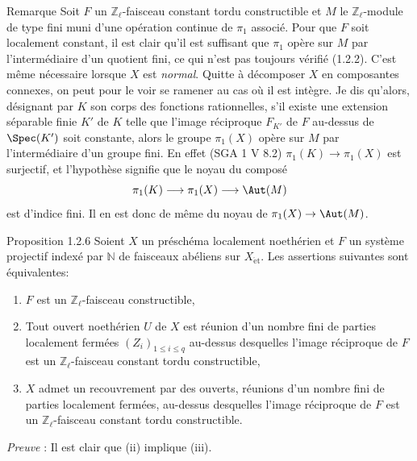 \begin{statement}{Remarque}
Soit \(F\) un \(\mathbb{Z}_\ell\)-faisceau constant tordu constructible et \(M\) le \(\mathbb{Z}_\ell\)-module de type fini muni d'une opération continue de \(\pi_1\) associé. Pour que \(F\) soit localement constant, il est clair qu'il est suffisant que \(\pi_1\) opère sur \(M\) par l'intermédiaire d'un quotient fini, ce qui n'est pas toujours vérifié (1.2.2). C'est même nécessaire lorsque \(X\) est \emph{normal}. Quitte à décomposer \(X\) en composantes connexes, on peut pour le voir se ramener au cas où il est intègre. Je dis qu'alors, désignant par \(K\) son corps des fonctions rationnelles, s'il existe une extension séparable finie \(K'\) de \(K\) telle que l'image réciproque \(F_{K'}\) de \(F\) au-dessus de \(\Spec(K')\) soit constante, alors le groupe \(\pi_1(X)\) opère sur \(M\) par l'intermédiaire d'un groupe fini. En effet (SGA 1 V 8.2) \(\pi_1(K)\to \pi_1(X)\) est surjectif, et l'hypothèse signifie que le noyau du composé
\[
\pi_1(K)\longrightarrow \pi_1(X)\longrightarrow \Aut(M)
\]
est d'indice fini. Il en est donc de même du noyau de \(\pi_1(X)\to\Aut(M)\).
\end{statement}

\begin{statement}{Proposition 1.2.6}
Soient \(X\) un préschéma localement noethérien et \(F\) un système projectif indexé par \(\mathbb{N}\) de faisceaux abéliens sur \(X_{\mathrm{\acute et}}\). Les assertions suivantes sont équivalentes:
\begin{enumerate}[label=(\roman*)]
\item \(F\) est un \(\mathbb{Z}_\ell\)-faisceau constructible,
\item Tout ouvert noethérien \(U\) de \(X\) est réunion d'un nombre fini de parties localement fermées \((Z_i)_{1\le i\le q}\) au-dessus desquelles l'image réciproque de \(F\) est un \(\mathbb{Z}_\ell\)-faisceau constant tordu constructible,
\item \(X\) admet un recouvrement par des ouverts, réunions d'un nombre fini de parties localement fermées, au-dessus desquelles l'image réciproque de \(F\) est un \(\mathbb{Z}_\ell\)-faisceau constant tordu constructible.
\end{enumerate}
\end{statement}


\emph{Preuve} : Il est clair que (ii) implique (iii).

